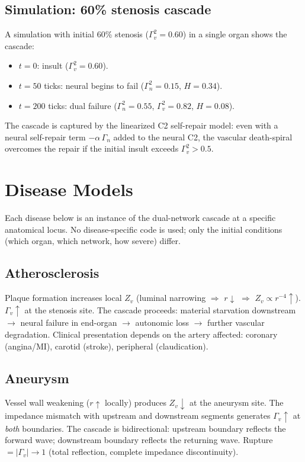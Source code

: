 \documentclass[aps,pre,twocolumn,superscriptaddress,floatfix]{revtex4-2}
\begin{document}
\subsection{Simulation: 60\% stenosis cascade}
\label{sec:stenosis-sim}

A simulation with initial 60\% stenosis
($\Gamma_v^2 = 0.60$) in a single organ shows the
cascade:
\begin{itemize}
  \item $t = 0$: insult ($\Gamma_v^2 = 0.60$).
  \item $t = 50$ ticks: neural begins to fail
    ($\Gamma_n^2 = 0.15$, $H = 0.34$).
  \item $t = 200$ ticks: dual failure
    ($\Gamma_n^2 = 0.55$, $\Gamma_v^2 = 0.82$,
    $H = 0.08$).
\end{itemize}
The cascade is captured by the linearized C2
self-repair model: even with a neural self-repair
term $-\alpha\,\Gamma_n$ added to the neural C2,
the vascular death-spiral overcomes the repair if
the initial insult exceeds $\Gamma_v^2 > 0.5$.


\section{Disease Models}
\label{sec:disease-models}

Each disease below is an instance of the dual-network
cascade at a specific anatomical locus.
No disease-specific code is used; only the initial
conditions (which organ, which network, how severe)
differ.


\subsection{Atherosclerosis}
\label{sec:athero}

Plaque formation increases local $Z_v$ (luminal
narrowing $\Rightarrow$ $r\!\downarrow$
$\Rightarrow$ $Z_v \propto r^{-4}\!\uparrow$).
$\Gamma_v\!\uparrow$ at the stenosis site.
The cascade proceeds: material starvation downstream
$\to$ neural failure in end-organ $\to$ autonomic loss
$\to$ further vascular degradation.
Clinical presentation depends on the artery affected:
coronary (angina/MI), carotid (stroke), peripheral
(claudication).


\subsection{Aneurysm}
\label{sec:aneurysm}

Vessel wall weakening ($r\!\uparrow$ locally) produces
$Z_v\!\downarrow$ at the aneurysm site.
The impedance mismatch with upstream and downstream
segments generates
$\Gamma_v\!\uparrow$ at \emph{both} boundaries.
The cascade is bidirectional: upstream boundary
reflects the forward wave; downstream boundary
reflects the returning wave.
Rupture $= |\Gamma_v| \to 1$ (total reflection,
complete impedance discontinuity).
\end{document}
